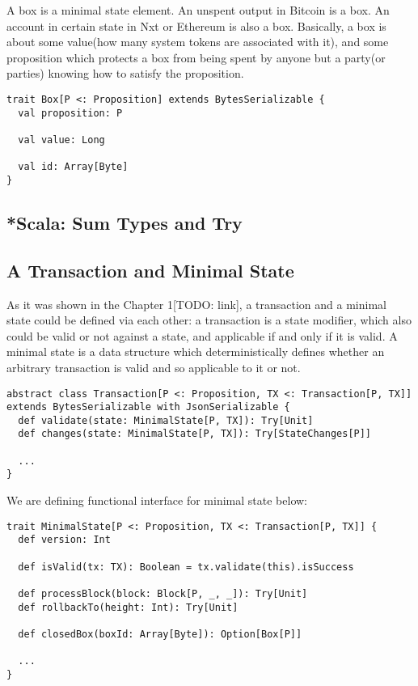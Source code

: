 \documentclass[]{report}   %
\begin{document}
A box is a minimal state element. An unspent output in Bitcoin is a box. An account in certain state in Nxt or Ethereum is also a box. Basically, a box is about some value(how many system tokens are associated with it), and some proposition which protects a box from being spent by anyone but a party(or parties) knowing how to satisfy the proposition.

\begin{lstlisting}
trait Box[P <: Proposition] extends BytesSerializable {
  val proposition: P

  val value: Long

  val id: Array[Byte]
}
\end{lstlisting}


\subsection{*Scala: Sum Types and Try}

\subsection{A Transaction and Minimal State}

As it was shown in the Chapter 1[TODO: link], a transaction and a minimal state could be defined via each other: a transaction is a state modifier, which also could be valid or not against a state, and applicable if and only if it is valid. A minimal state is a data structure which deterministically defines whether an arbitrary transaction is valid and so applicable to it or not. 

\begin{lstlisting}
abstract class Transaction[P <: Proposition, TX <: Transaction[P, TX]] extends BytesSerializable with JsonSerializable {
  def validate(state: MinimalState[P, TX]): Try[Unit]
  def changes(state: MinimalState[P, TX]): Try[StateChanges[P]]

  ...
}
\end{lstlisting}

We are defining functional interface for minimal state below:

\begin{lstlisting}
trait MinimalState[P <: Proposition, TX <: Transaction[P, TX]] {
  def version: Int

  def isValid(tx: TX): Boolean = tx.validate(this).isSuccess

  def processBlock(block: Block[P, _, _]): Try[Unit]
  def rollbackTo(height: Int): Try[Unit]

  def closedBox(boxId: Array[Byte]): Option[Box[P]]

  ...
}
\end{lstlisting}
\end{document}

